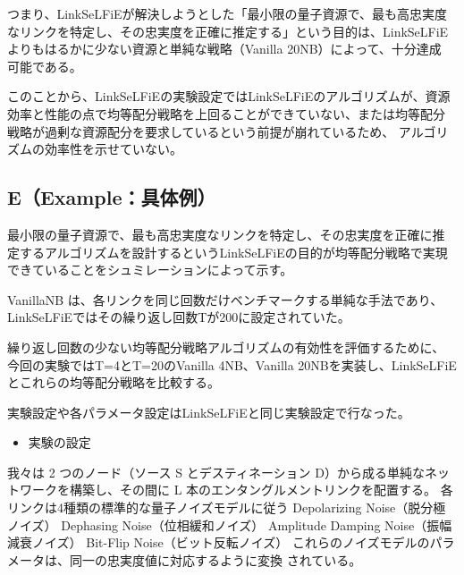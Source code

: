 \documentclass[technicalreport,dvipdfmx]{ieicej}
\begin{document}
つまり、LinkSeLFiEが解決しようとした「最小限の量子資源で、最も高忠実度
なリンクを特定し、その忠実度を正確に推定する」という目的は、LinkSeLFiE
よりもはるかに少ない資源と単純な戦略（Vanilla 20NB）によって、十分達成
可能である。

このことから、LinkSeLFiEの実験設定ではLinkSeLFiEのアルゴリズムが、資源
効率と性能の点で均等配分戦略を上回ることができていない、または均等配分
戦略が過剰な資源配分を要求しているという前提が崩れているため、
アルゴリズムの効率性を示せていない。
\subsection{E（Example：具体例）}
\label{sec:orgfcc698c}
最小限の量子資源で、最も高忠実度なリンクを特定し、その忠実度を正確に推
定するアルゴリズムを設計するというLinkSeLFiEの目的が均等配分戦略で実現
できていることをシュミレーションによって示す。

VanillaNB は、各リンクを同じ回数だけベンチマークする単純な手法であり、
LinkSeLFiEではその繰り返し回数Tが200に設定されていた。

繰り返し回数の少ない均等配分戦略アルゴリズムの有効性を評価するために、
今回の実験ではT=4とT=20のVanilla 4NB、Vanilla 20NBを実装し、LinkSeLFiE
とこれらの均等配分戦略を比較する。

実験設定や各パラメータ設定はLinkSeLFiEと同じ実験設定で行なった。

\begin{itemize}
\item 実験の設定
\end{itemize}
我々は 2 つのノード（ソース S とデスティネーション D）から成る単純なネッ
トワークを構築し、その間に L 本のエンタングルメントリンクを配置する。
各リンクは4種類の標準的な量子ノイズモデルに従う
Depolarizing Noise（脱分極ノイズ）
Dephasing Noise（位相緩和ノイズ）
Amplitude Damping Noise（振幅減衰ノイズ）
Bit-Flip Noise（ビット反転ノイズ）
これらのノイズモデルのパラメータは、同一の忠実度値に対応するように変換
されている。
\end{document}
